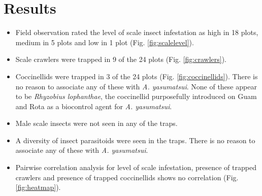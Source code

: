 \documentclass[12pt,letterpaper,english,bibliography=totocnumbered, abstract=on]{scrartcl}
\begin{document}
\section{Results}

\begin{itemize}

\item
Field observation rated the level of scale insect infestation as high in 18 plots, medium in 5 plots and low in 1 plot (Fig. \ref{fig:scalelevel}).

\item
Scale crawlers were trapped in 9 of the 24 plots (Fig. \ref{fig:crawlers}).

\item
Coccinellids were trapped in 3 of the 24 plots (Fig. \ref{fig:coccinellids}). There is no reason to associate any of these with \textit{A. yasumatsui}. None of these appear to be \textit{Rhyzobius lophanthae}, the coccinellid purposefully introduced on Guam and Rota as a biocontrol agent for \textit{A. yasumatsui}.

\item
Male scale insects were not seen in any of the traps.

\item
A diversity of insect parasitoids were seen in the traps. There is no reason to associate any of these with \textit{A. yasumatsui}.

\item
Pairwise correlation analysis for level of scale infestation, presence of trapped crawlers and presence of trapped coccinellids shows no correlation (Fig. \ref{fig:heatmap}).

\end{itemize}
\end{document}
